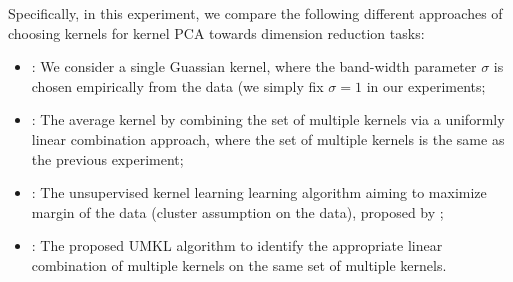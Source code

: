Specifically, in this experiment, we compare the following different approaches of choosing kernels for kernel PCA towards dimension reduction tasks:
\begin{itemize}
\item [] \hspace{-1cm}{\bf Guassian}: We consider a single Guassian kernel, where the band-width parameter $\sigma$ is chosen empirically from the data (we simply fix $\sigma=1$ in our experiments;
\item []\hspace{-1cm}{\bf Average}: The average kernel by combining the set of multiple kernels via a uniformly linear combination approach, where the set of multiple kernels is the same as the previous experiment;
\item []\hspace{-1cm}{\bf C-UKL}: The unsupervised kernel learning learning algorithm aiming to maximize margin of the data (cluster assumption on the data), proposed by \cite{nips/ValizadeganJ06};
\item []\hspace{-1cm}{\bf UMKL}: The proposed UMKL algorithm to identify the appropriate linear combination of multiple kernels on the same set of multiple kernels.
\end{itemize}

